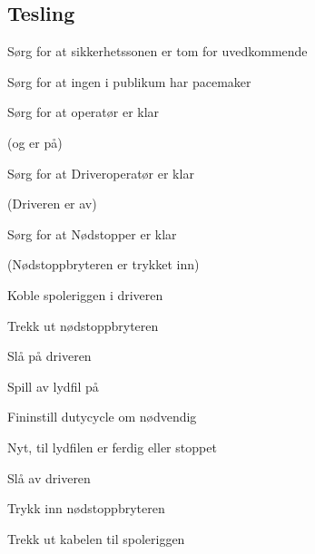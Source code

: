 \subsection{Tesling}
\begin{todolist}
    \setlength{\itemsep}{2pt}
    \iftoggle{INTERN}{
        \item{Sørg for at Hanskeholder har på hanske og er klar}
    }{
    }
    \item{Sørg for at sikkerhetssonen er tom for uvedkommende}
    \item{Sørg for at ingen i publikum har pacemaker}
    \item{Sørg for at \pulsformer operatør er klar}
    \item{(\Pulsformer { }og \signalkilde { }er på)}
    \item{Sørg for at Driveroperatør er klar}
    \item{(Driveren er av)}
    \item{Sørg for at Nødstopper er klar}
    \item{(Nødstoppbryteren er trykket inn)}
    \item{Koble spoleriggen i driveren}
    \item{Trekk ut nødstoppbryteren}
    \item{Slå på driveren}
    \iftoggle{INTERN}{
        \item{Sørg for at Hanskeholder er klar}
    }{
    }
    \item{Spill av lydfil på \signalkilde}
    \iftoggle{INTERN}{
        \item{Observer overslag fra topload til hanske eller corona}
    }{
        \item{Observer overslag fra topload til jordingspunkt eller corona}
    }
    \item{Fininstill dutycycle om nødvendig}
    \item{Nyt, til lydfilen er ferdig eller stoppet}
    \item{Slå av driveren}
    \item{Trykk inn nødstoppbryteren}
    \item{Trekk ut kabelen til spoleriggen}
    \iftoggle{INTERN}{
        \item{Ta på toploaden med hansken (jording av kretsen)}
    }{
    }
\end{todolist}